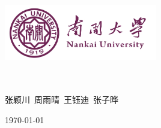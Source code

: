 \documentclass[a4paper,12pt]{article}
\begin{document}
\begin{titlepage}
	\begin{center}
		
    \includegraphics[width=0.5\textwidth]{figure//Njust.png}\\
    \vspace{10mm}
    \vspace{40mm}
    \textbf{}\\%
    \end{center}

	\vspace{\fill}
	
\setlength{\extrarowheight}{3mm}
{\songti{}	

	
	\begin{center}
		\\
		张颖川\ 周雨晴\ 王钰迪\ 张子晔
	\end{center}
	
	\begin{center}
\vspace{\fill}
\today
	\end{center}	
}
\end{titlepage}


\tableofcontents %

\newpage
\end{document}

